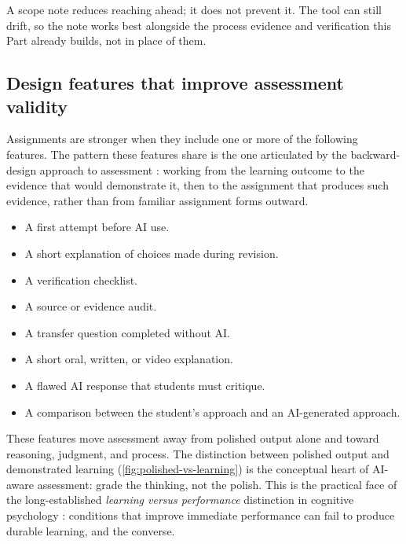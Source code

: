 \documentclass{SIAMbook2023}
\begin{document}
A scope note reduces reaching ahead; it does not prevent it. The tool can still drift, so the note works best alongside the process evidence and verification this Part already builds, not in place of them.

\subsection{Design features that improve assessment validity}
\label{i:subsec:validity-features}%

Assignments are stronger when they include one or more of the following features. The pattern these features share is the one articulated by the backward-design approach to assessment \citep{wiggins2005understanding}: working from the learning outcome to the evidence that would demonstrate it, then to the assignment that produces such evidence, rather than from familiar assignment forms outward.

\begin{itemize}
\item A first attempt before AI use.
\item A short explanation of choices made during revision.
\item A verification checklist.
\item A source or evidence audit.
\item A transfer question completed without AI.
\item A short oral, written, or video explanation.
\item A flawed AI response that students must critique.
\item A comparison between the student's approach and an AI-generated approach.
\end{itemize}

These features move assessment away from polished output alone and toward reasoning, judgment, and process. The distinction between polished output and demonstrated learning (\cref{fig:polished-vs-learning}) is the conceptual heart of AI-aware assessment: grade the thinking, not the polish. This is the practical face of the long-established \emph{learning versus performance} distinction in cognitive psychology \citep{soderstrom2015learning,bjork2011making}: conditions that improve immediate performance can fail to produce durable learning, and the converse.
\end{document}
